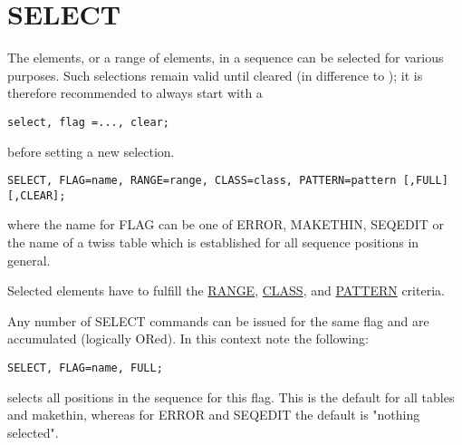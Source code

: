 











%
\section{SELECT}
\label{sec:selection}
The elements, or a range of elements, in a sequence can be selected for
various purposes. Such selections remain valid until cleared (in
difference to \madeight); it is therefore recommended to always start with a  

\begin{verbatim}
select, flag =..., clear;
\end{verbatim} 
before setting a new selection. 
\begin{verbatim}
SELECT, FLAG=name, RANGE=range, CLASS=class, PATTERN=pattern [,FULL] [,CLEAR];
\end{verbatim} 
where the name for FLAG can be one of ERROR, MAKETHIN, SEQEDIT or the
name of a twiss table which is established for all sequence positions in
general.  

Selected elements have to fulfill the \href{ranges.html#range}{RANGE},
\href{ranges.html#class}{CLASS}, and \href{wildcard.html}{PATTERN}
criteria.  

Any number of SELECT commands can be issued for the same flag and are
accumulated (logically ORed). In this context note the following:  

\begin{verbatim}
SELECT, FLAG=name, FULL;
\end{verbatim} 
selects all positions in the sequence for this flag. This is the default
for all tables and makethin, whereas for ERROR and SEQEDIT the default
is "nothing selected".  

